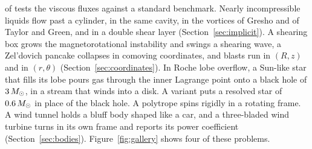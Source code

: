 \documentclass[twocolumn]{aastex701}
\begin{document}
of \citet{Ghia1982} tests the viscous fluxes against a standard benchmark. Nearly incompressible liquids flow past a cylinder, in the same cavity, in the vortices of Gresho and of Taylor and Green, and in a double shear layer (Section~\ref{sec:implicit}). A shearing box grows the magnetorotational instability and swings a shearing wave, a Zel'dovich pancake collapses in comoving coordinates, and blasts run in $(R, z)$ and in $(r, \theta)$ (Section~\ref{sec:coordinates}). In Roche lobe overflow, a Sun-like star that fills its lobe pours gas through the inner Lagrange point onto a black hole of $3\,M_\odot$, in a stream that winds into a disk. A variant puts a resolved star of $0.6\,M_\odot$ in place of the black hole. A polytrope spins rigidly in a rotating frame. A wind tunnel holds a bluff body shaped like a car, and a three-bladed wind turbine turns in its own frame and reports its power coefficient (Section~\ref{sec:bodies}). Figure~\ref{fig:gallery} shows four of these problems.
\end{document}
